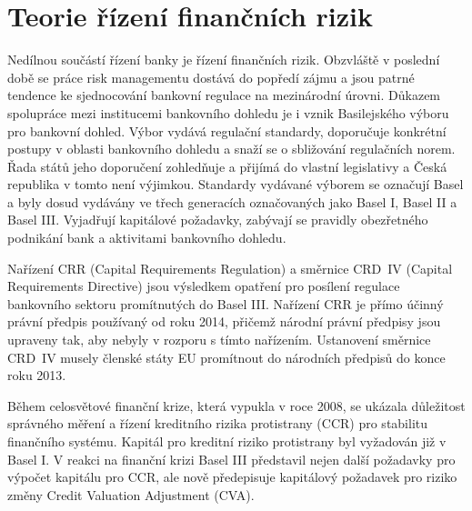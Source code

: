 \documentclass[a4paper,12pt]{report}
\theoremstyle{definition} \newtheorem{definice}[veta]{Definice}
\theoremstyle{remark}
\begin{document}
\chapter{Teorie řízení finančních rizik} \label{rizika_kap}


Nedílnou součástí řízení banky je řízení finančních rizik.
Obzvláště v poslední době se práce risk managementu dostává do popředí zájmu
a jsou patrné tendence ke sjednocování bankovní regulace na mezinárodní úrovni.
Důkazem spolupráce mezi institucemi bankovního dohledu je i vznik Basilejského výboru pro bankovní dohled.
Výbor vydává regulační standardy, doporučuje konkrétní postupy v oblasti bankovního dohledu a snaží se o sbližování regulačních norem. 
Řada států jeho doporučení zohledňuje a přijímá do vlastní legislativy a Česká republika v tomto není výjimkou.
Standardy vydávané výborem se označují Basel a byly dosud vydávány ve třech generacích označovaných jako Basel I, Basel II a Basel III. 
Vyjadřují kapitálové požadavky, zabývají se pravidly obezřetného podnikání bank a aktivitami bankovního dohledu.


Nařízení CRR (Capital Requirements Regulation) \cite{EU2013} a
směrnice CRD~IV (Capital Requirements Directive) \cite{EU2013a}
jsou výsledkem opatření pro posílení regulace bankovního sektoru promítnutých do Basel III.
Nařízení CRR je přímo účinný právní předpis používaný od roku 2014, přičemž národní právní předpisy jsou upraveny tak, aby nebyly v rozporu s tímto nařízením. 
Ustanovení směrnice CRD~IV musely členské státy EU promítnout do národních předpisů do konce roku 2013.

Během celosvětové finanční krize, která vypukla v roce 2008, se ukázala důležitost správného měření a řízení kreditního rizika protistrany (CCR) pro stabilitu finančního systému.
Kapitál pro kreditní riziko protistrany byl vyžadován již v Basel I.  
V reakci na finanční krizi Basel III představil nejen další požadavky pro výpočet kapitálu pro CCR, ale nově
předepisuje kapitálový požadavek pro riziko změny Credit Valuation Adjustment (CVA). 
\end{document}
